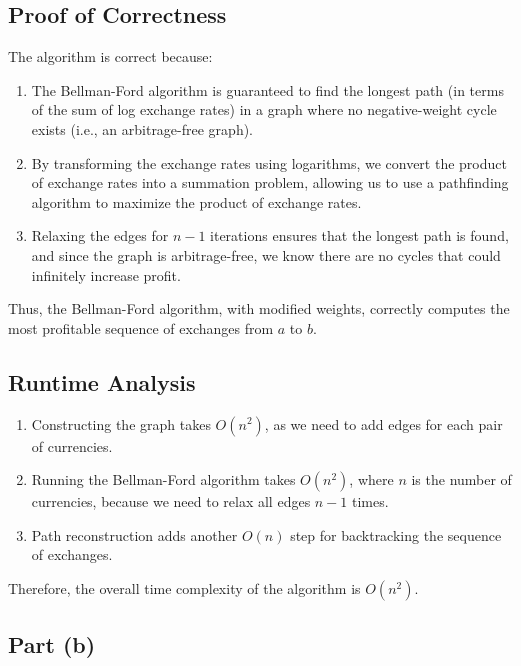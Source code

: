 \documentclass[11pt]{article}
\begin{document}
\subsection*{Proof of Correctness}

The algorithm is correct because:

\begin{enumerate}
    \item The Bellman-Ford algorithm is guaranteed to find the longest path (in terms of the sum of log exchange rates) in a graph where no negative-weight cycle exists (i.e., an arbitrage-free graph).
    \item By transforming the exchange rates using logarithms, we convert the product of exchange rates into a summation problem, allowing us to use a pathfinding algorithm to maximize the product of exchange rates.
    \item Relaxing the edges for \( n-1 \) iterations ensures that the longest path is found, and since the graph is arbitrage-free, we know there are no cycles that could infinitely increase profit.
\end{enumerate}

Thus, the Bellman-Ford algorithm, with modified weights, correctly computes the most profitable sequence of exchanges from \( a \) to \( b \).

\subsection*{Runtime Analysis}

\begin{enumerate}
    \item Constructing the graph takes \( O(n^2) \), as we need to add edges for each pair of currencies.
    \item Running the Bellman-Ford algorithm takes \( O(n^2) \), where \( n \) is the number of currencies, because we need to relax all edges \( n-1 \) times.
    \item Path reconstruction adds another \( O(n) \) step for backtracking the sequence of exchanges.
\end{enumerate}

Therefore, the overall time complexity of the algorithm is \( O(n^2) \).

\subsection*{Part (b)}
\end{document}
